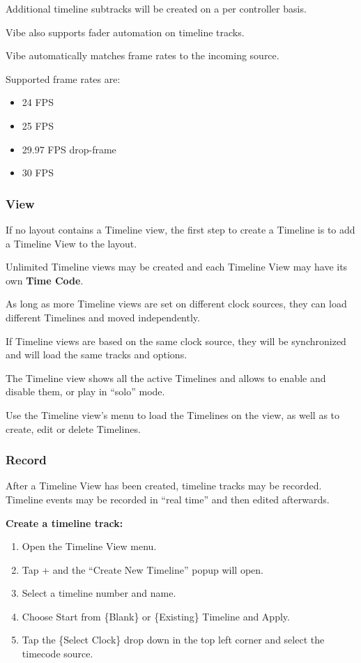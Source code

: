 \documentclass[
]{article}
\begin{document}
Additional timeline subtracks will be created on a per controller basis.

Vibe also supports fader automation on timeline tracks.

Vibe automatically matches frame rates to the incoming source.

Supported frame rates are:

\begin{itemize}
\item
  24 FPS
\item
  25 FPS
\item
  29.97 FPS drop-frame
\item
  30 FPS
\end{itemize}

\hypertarget{view}{%
\subsubsection{View}\label{view}}

If no layout contains a Timeline view, the first step to create a Timeline is to add a Timeline View to the layout.

Unlimited Timeline views may be created and each Timeline View may have its own \textbf{Time Code}.

As long as more Timeline views are set on different clock sources, they can load different Timelines and moved independently.

If Timeline views are based on the same clock source, they will be synchronized and will load the same tracks and options.

The Timeline view shows all the active Timelines and allows to enable and disable them, or play in ``solo'' mode.

Use the Timeline view's menu to load the Timelines on the view, as well as to create, edit or delete Timelines.

\hypertarget{record}{%
\subsubsection{Record}\label{record}}

After a Timeline View has been created, timeline tracks may be recorded.
Timeline events may be recorded in ``real time'' and then edited afterwards.

\textbf{Create a timeline track:}

\begin{enumerate}
\def\labelenumi{\arabic{enumi}.}
\item
  Open the Timeline View menu.
\item
  Tap + and the ``Create New Timeline'' popup will open.
\item
  Select a timeline number and name.
\item
  Choose Start from \{Blank\} or \{Existing\} Timeline and Apply.
\item
  Tap the \{Select Clock\} drop down in the top left corner and select the timecode source.
\end{enumerate}
\end{document}
